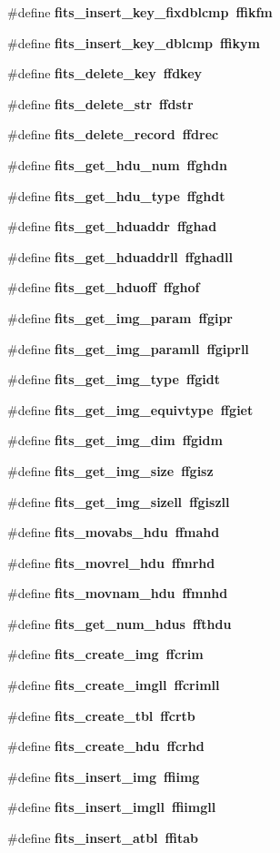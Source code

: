 \begin{CompactItemize}
\#define \bf{fits\_\-insert\_\-key\_\-fixdblcmp}~ffikfm
\item 
\#define \bf{fits\_\-insert\_\-key\_\-dblcmp}~ffikym
\item 
\#define \bf{fits\_\-delete\_\-key}~ffdkey
\item 
\#define \bf{fits\_\-delete\_\-str}~ffdstr
\item 
\#define \bf{fits\_\-delete\_\-record}~ffdrec
\item 
\#define \bf{fits\_\-get\_\-hdu\_\-num}~ffghdn
\item 
\#define \bf{fits\_\-get\_\-hdu\_\-type}~ffghdt
\item 
\#define \bf{fits\_\-get\_\-hduaddr}~ffghad
\item 
\#define \bf{fits\_\-get\_\-hduaddrll}~ffghadll
\item 
\#define \bf{fits\_\-get\_\-hduoff}~ffghof
\item 
\#define \bf{fits\_\-get\_\-img\_\-param}~ffgipr
\item 
\#define \bf{fits\_\-get\_\-img\_\-paramll}~ffgiprll
\item 
\#define \bf{fits\_\-get\_\-img\_\-type}~ffgidt
\item 
\#define \bf{fits\_\-get\_\-img\_\-equivtype}~ffgiet
\item 
\#define \bf{fits\_\-get\_\-img\_\-dim}~ffgidm
\item 
\#define \bf{fits\_\-get\_\-img\_\-size}~ffgisz
\item 
\#define \bf{fits\_\-get\_\-img\_\-sizell}~ffgiszll
\item 
\#define \bf{fits\_\-movabs\_\-hdu}~ffmahd
\item 
\#define \bf{fits\_\-movrel\_\-hdu}~ffmrhd
\item 
\#define \bf{fits\_\-movnam\_\-hdu}~ffmnhd
\item 
\#define \bf{fits\_\-get\_\-num\_\-hdus}~ffthdu
\item 
\#define \bf{fits\_\-create\_\-img}~ffcrim
\item 
\#define \bf{fits\_\-create\_\-imgll}~ffcrimll
\item 
\#define \bf{fits\_\-create\_\-tbl}~ffcrtb
\item 
\#define \bf{fits\_\-create\_\-hdu}~ffcrhd
\item 
\#define \bf{fits\_\-insert\_\-img}~ffiimg
\item 
\#define \bf{fits\_\-insert\_\-imgll}~ffiimgll
\item 
\#define \bf{fits\_\-insert\_\-atbl}~ffitab
\item 

\end{CompactItemize}
